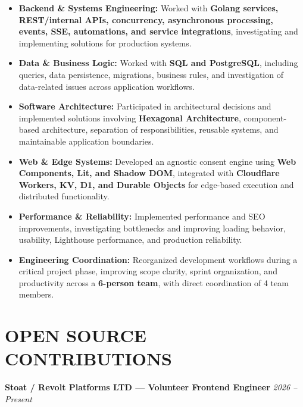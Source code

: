 \documentclass[10pt,a4paper]{article}
\begin{document}
\begin{itemize}
    \item
    \textbf{Backend \& Systems Engineering:}
    Worked with \textbf{Golang services, REST/internal APIs,
    concurrency, asynchronous processing, events, SSE,
    automations, and service integrations}, investigating and
    implementing solutions for production systems.

    \item
    \textbf{Data \& Business Logic:}
    Worked with \textbf{SQL and PostgreSQL}, including queries,
    data persistence, migrations, business rules, and investigation
    of data-related issues across application workflows.

    \item
    \textbf{Software Architecture:}
    Participated in architectural decisions and implemented
    solutions involving \textbf{Hexagonal Architecture},
    component-based architecture, separation of responsibilities,
    reusable systems, and maintainable application boundaries.

    \item
    \textbf{Web \& Edge Systems:}
    Developed an agnostic consent engine using
    \textbf{Web Components, Lit, and Shadow DOM}, integrated with
    \textbf{Cloudflare Workers, KV, D1, and Durable Objects}
    for edge-based execution and distributed functionality.

    \item
    \textbf{Performance \& Reliability:}
    Implemented performance and SEO improvements, investigating
    bottlenecks and improving loading behavior, usability,
    Lighthouse performance, and production reliability.

    \item
    \textbf{Engineering Coordination:}
    Reorganized development workflows during a critical project phase,
    improving scope clarity, sprint organization, and productivity
    across a \textbf{6-person team}, with direct coordination of
    4 team members.

\end{itemize}


\section*{OPEN SOURCE CONTRIBUTIONS}

\noindent
\textbf{Stoat / Revolt Platforms LTD — Volunteer Frontend Engineer}
\hfill
\textit{2026 -- Present}
\end{document}

